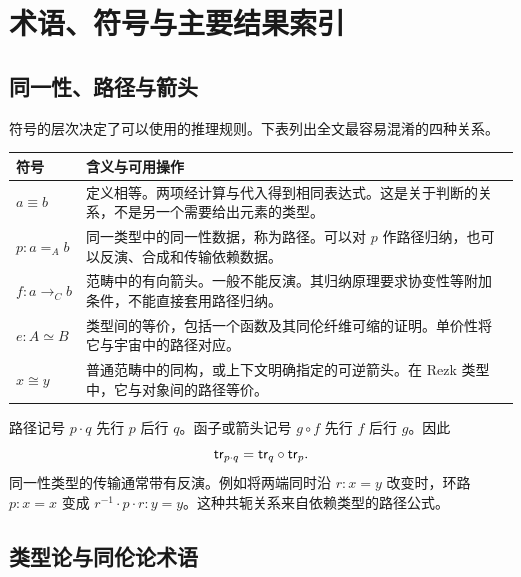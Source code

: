 \chapter{术语、符号与主要结果索引}
\label{chap:glossary}

\section{同一性、路径与箭头}

\begin{remark}[四类相等关系]
符号的层次决定了可以使用的推理规则。下表列出全文最容易混淆的四种关系。
\end{remark}

\begin{longtable}{@{}p{34mm}p{96mm}@{}}
\toprule
符号 & 含义与可用操作\\
\midrule
\endhead
$a\equiv b$ & 定义相等。两项经计算与代入得到相同表达式。这是关于判断的关系，不是另一个需要给出元素的类型。\\[5pt]
$p:a=_A b$ & 同一类型中的同一性数据，称为路径。可以对 $p$ 作路径归纳，也可以反演、合成和传输依赖数据。\\[5pt]
$f:a\to_C b$ & 范畴中的有向箭头。一般不能反演。其归纳原理要求协变性等附加条件，不能直接套用路径归纳。\\[5pt]
$e:A\simeq B$ & 类型间的等价，包括一个函数及其同伦纤维可缩的证明。单价性将它与宇宙中的路径对应。\\[5pt]
$x\cong y$ & 普通范畴中的同构，或上下文明确指定的可逆箭头。在 Rezk 类型中，它与对象间的路径等价。\\
\bottomrule
\end{longtable}

\begin{remark}[合成方向]
路径记号 $p\cdot q$ 先行 $p$ 后行 $q$。函子或箭头记号 $g\circ f$ 先行 $f$ 后行 $g$。因此
\[
 \mathsf{tr}_{p\cdot q}=\mathsf{tr}_q\circ\mathsf{tr}_p.
\]
同一性类型的传输通常带有反演。例如将两端同时沿 $r:x=y$ 改变时，环路 $p:x=x$ 变成 $r^{-1}\cdot p\cdot r:y=y$。这种共轭关系来自依赖类型的路径公式。
\end{remark}

\section{类型论与同伦论术语}

